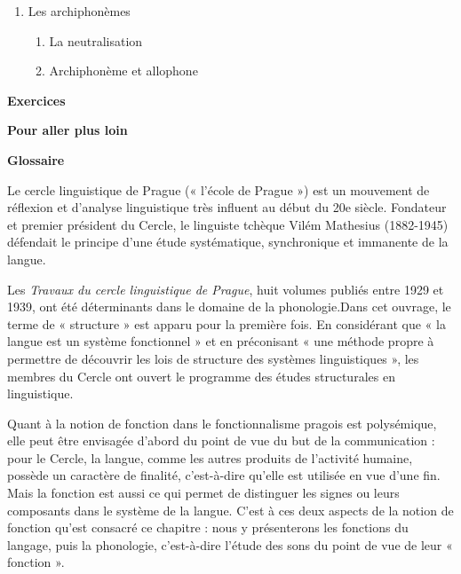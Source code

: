 \begin{keybox}
\begin{enumerate}[label=\arabic*.]
\begin{enumerate}[label=\textcircled{\scriptsize\arabic*}]
\begin{enumerate}[label=\arabic*.]
\item Les allophones des tonèmes\par
1) Le \textit{sandhi} tonal\par
2) Le cas du mandarin
\end{enumerate}
\item Les archiphonèmes
\begin{enumerate}[label=\arabic*.]
\item La neutralisation
\item Archiphonème et allophone
\end{enumerate}
\end{enumerate}
\end{enumerate}
\textbf{Exercices}\par
\textbf{Pour aller plus loin}\par
\textbf{Glossaire}
\end{keybox}

\begin{keybox}[Introduction]
\renewcommand{\thempfootnote}{校\arabic{editorialnote}}
Le cercle linguistique de Prague (« l’école de Prague ») est un mouvement de réflexion et d’analyse linguistique très influent au début du 20e siècle. Fondateur et premier président du Cercle, le linguiste tchèque Vilém Mathesius (1882-1945) défendait le principe d’une étude systématique, synchronique et immanente de la langue.

Les \textit{Travaux du cercle linguistique de Prague}, huit volumes publiés entre 1929 et 1939, ont été déterminants dans le domaine de la phonologie.Dans cet ouvrage, le terme de « structure » est apparu pour la première fois. En considérant que « la langue est un système fonctionnel » et en préconisant « une méthode propre à permettre de découvrir les lois de structure des systèmes linguistiques », les membres du Cercle ont ouvert le programme des études structurales en linguistique.

Quant à la notion de fonction dans le fonctionnalisme pragois est polysémique, elle peut être envisagée d’abord du point de vue du but de la communication : pour le Cercle, la langue, comme les autres produits de l’activité humaine, possède un caractère de finalité, c’est-à-dire qu’elle est utilisée en vue d’une fin. Mais la fonction est aussi ce qui permet de distinguer les signes ou leurs composants dans le système de la langue. C’est à ces deux aspects de la notion de fonction qu’est consacré ce chapitre : nous y présenterons les fonctions du langage, puis la phonologie, c’est-à-dire l’étude des sons du point de vue de leur « fonction ».
\end{keybox}

